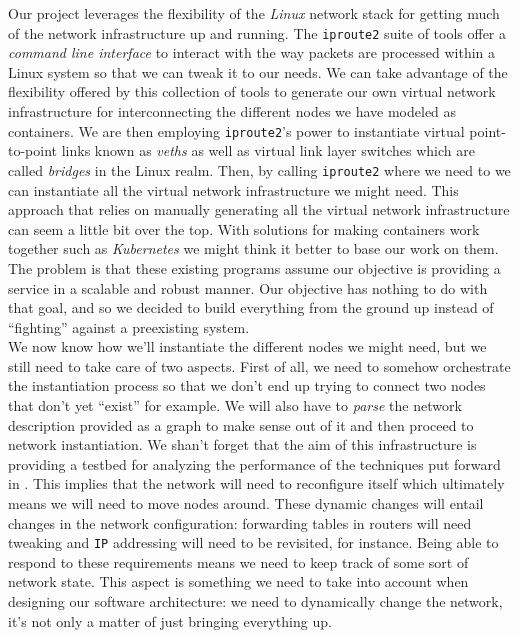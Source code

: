 \documentclass[12pt]{article}
\begin{document}
        Our project leverages the flexibility of the \textit{Linux} network stack for getting much of the network infrastructure up and running. The \texttt{iproute2} suite of tools offer a \textit{command line interface} to interact with the way packets are processed within a Linux system so that we can tweak it to our needs. We can take advantage of the flexibility offered by this collection of tools to generate our own virtual network infrastructure for interconnecting the different nodes we have modeled as containers. We are then employing \texttt{iproute2}'s power to instantiate virtual point-to-point links known as \textit{veths} as well as virtual link layer switches which are called \textit{bridges} in the Linux realm. Then, by calling \texttt{iproute2} where we need to we can instantiate all the virtual network infrastructure we might need. This approach that relies on manually generating all the virtual network infrastructure can seem a little bit over the top. With solutions for making containers work together such as \textit{Kubernetes} we might think it better to base our work on them. The problem is that these existing programs assume our objective is providing a service in a scalable and robust manner. Our objective has nothing to do with that goal, and so we decided to build everything from the ground up instead of ``fighting'' against a preexisting system.\\

        We now know how we'll instantiate the different nodes we might need, but we still need to take care of two aspects. First of all, we need to somehow orchestrate the instantiation process so that we don't end up trying to connect two nodes that don't yet ``exist'' for example. We will also have to \textit{parse} the network description provided as a graph to make sense out of it and then proceed to network instantiation. We shan't forget that the aim of this infrastructure is providing a testbed for analyzing the performance of the techniques put forward in \cite{bib:REACT}. This implies that the network will need to reconfigure itself which ultimately means we will need to move nodes around. These dynamic changes will entail changes in the network configuration: forwarding tables in routers will need tweaking and \texttt{IP} addressing will need to be revisited, for instance. Being able to respond to these requirements means we need to keep track of some sort of network state. This aspect is something we need to take into account when designing our software architecture: we need to dynamically change the network, it's not only a matter of just bringing everything up.\\
\end{document}

